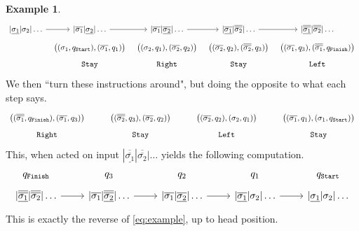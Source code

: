 \documentclass[12pt]{article}
\theoremstyle{plain}
\theoremstyle{definition}
\newtheorem{example}[thm]{Example}
\begin{document}
\begin{example}
\begin{equation*}
\begin{tikzcd}[row sep = tiny, column sep = tiny]
			{|\underline{\sigma_1}|\sigma_2|\ldots}\arrow[r] & {|\overline{\sigma_1}|\underline{\sigma_2}|\ldots}\arrow[r] & {|\overline{\sigma_1}|\underline{\overline{\sigma_2}}|\ldots}\arrow[r] & {|\underline{\overline{\sigma_1}}|\overline{\overline{\sigma_2}}|\ldots}\arrow[r] & {|\underline{\overline{\overline{\sigma_1}}}|\overline{\overline{\sigma_2}}|\ldots}\\
			& {\big((\sigma_1, q_{\texttt{Start}}), (\overline{\sigma_1}, q_1)\big)} & {\big((\sigma_2, q_1), (\overline{\sigma_2}, q_2)\big)} & {\big((\overline{\sigma_2}, q_2), (\overline{\overline{\sigma_2}}, q_3)\big)} & {\big((\overline{\sigma_1}, q_3), (\overline{\overline{\sigma_1}}, q_{\texttt{Finish}})\big)}\\
			& \texttt{Stay} & \texttt{Right} & \texttt{Stay} & \texttt{Left}
		\end{tikzcd}
	\end{equation*}
We then ``turn these instructions around", but doing the opposite to what each step says.
\begin{equation}
	\begin{tikzcd}[row sep = tiny, row sep = tiny]
		{\big( (\overline{\overline{\sigma_1}}, q_{\texttt{Finish}}),(\overline{\sigma_1}, q_3)\big)} & {\big( (\overline{\overline{\sigma_2}}, q_3),(\overline{\sigma_2}, q_2)\big)} & {\big( (\overline{\sigma_2}, q_2),(\sigma_2, q_1)\big)} & {\big( (\overline{\sigma_1}, q_1),(\sigma_1, q_{\texttt{Start}})\big)}\\
		\texttt{Right} & \texttt{Stay} & \texttt{Left} & \texttt{Stay}
		\end{tikzcd}
	\end{equation}
This, when acted on input ${|\underline{\overline{\overline{\sigma_1}}}|\overline{\overline{\sigma_2}}|\ldots}$ yields the following computation.
\begin{equation}
	\begin{tikzcd}[row sep = tiny]
		{q_{\texttt{Finish}}} & q_3 & q_2 & q_1 & q_{\texttt{Start}}\\
		{|\underline{\overline{\overline{\sigma_1}}}|\overline{\overline{\sigma_2}}|\ldots}\arrow[r] & {|\overline{\sigma_1}|\underline{\overline{\overline{\sigma_2}}}}|\ldots\arrow[r] & {|\overline{\sigma_1}|\underline{\overline{\sigma_2}}|\ldots}\arrow[r] & {|\underline{\overline{\sigma_1}}|\sigma_2|\ldots}\arrow[r] & {|\underline{\sigma_1}|\sigma_2|\ldots}
		\end{tikzcd}
	\end{equation}
This is exactly the reverse of \eqref{eq:example}, up to head position.
		\end{example}
	
\end{document}
